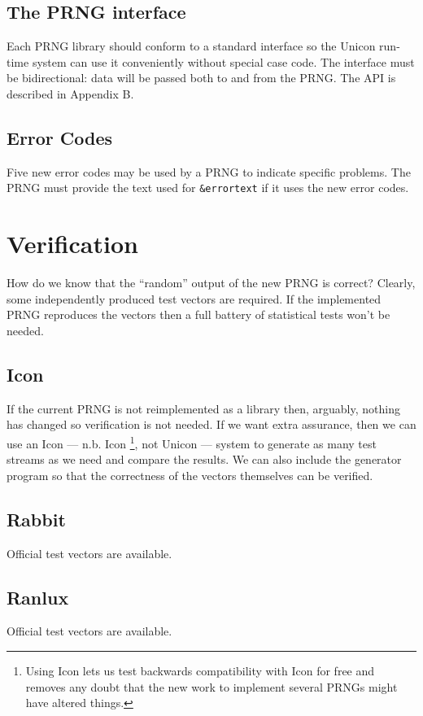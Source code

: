 \documentclass[letterpaper,12pt]{article}
\begin{document}
\subsection{The PRNG interface}
Each PRNG library should conform to a standard interface so the Unicon
run-time system can use it conveniently without special case code. The
interface must be bidirectional: data will be passed both to and from the
PRNG. The API is described in Appendix B.

\subsection{Error Codes}
Five new error codes may be used by a PRNG to indicate specific
problems. The PRNG must provide the text used for \texttt{\&errortext}
if it uses the new error codes.

\section{Verification}
How do we know that the ``random'' output of the new PRNG is correct?
Clearly, some independently produced test vectors are required. If the
implemented PRNG reproduces the vectors then a full battery of statistical
tests won't be needed.

\subsection{Icon}
If the current PRNG is not reimplemented as a library then, arguably,
nothing has changed so verification is not needed. If we want extra
assurance, then we can use an Icon --- n.b. Icon%
\footnote{
  Using Icon lets us test backwards compatibility with Icon for free and
  removes any doubt that the new work to implement several PRNGs might have
  altered things.
},
not Unicon --- system to generate as many test streams as we need and
compare the results. We can also include the generator program so that the
correctness of the vectors themselves can be verified.

\subsection{Rabbit}
Official test vectors are available.

\subsection{Ranlux}
Official test vectors are available.
\end{document}
